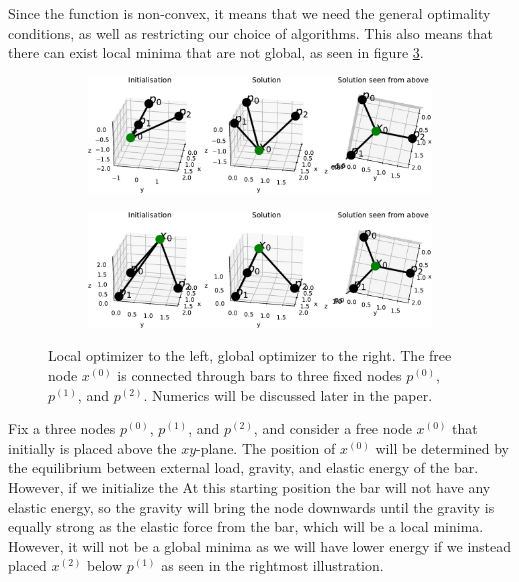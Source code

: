 Since the function is non-convex, it means that we need the general optimality conditions, as well as restricting our choice of algorithms. This also means that there can exist local minima that are not global, as seen in figure \ref{fig:local_optimizer}. 
\begin{figure}
\centering
\begin{subfigure}{.5\textwidth}
  \centering
  \includegraphics[width=\linewidth]{Bilder/localminpos.pdf}
  \label{fig:}
\end{subfigure}%
\begin{subfigure}{.5\textwidth}
  \centering
  \includegraphics[width=1\linewidth]{Bilder/localminneg.pdf}
  \label{fig:sub2}
\end{subfigure}
\caption{Local optimizer to the left, global optimizer to the right. The free node $x^{(0)}$ is connected through bars to three fixed nodes  $p^{(0)}$, $p^{(1)}$, and $p^{(2)}$. Numerics will be discussed later in the paper.}
\label{fig:local_optimizer}
\end{figure}

Fix a three nodes $p^{(0)}$, $p^{(1)}$, and $p^{(2)}$, and consider a free node $x^{(0)}$ that initially is placed above the $xy$-plane. The position of $x^{(0)}$ will be determined by the equilibrium between external load, gravity, and elastic energy of the bar. However, if we initialize the
At this starting position the bar will not have any elastic energy, so the gravity will bring the node downwards until the gravity is equally strong as the elastic force from the bar, which will be a local minima. However, it will not be a global minima as we will have lower energy if we instead placed $x^{(2)}$ below $p^{(1)}$ as seen in the rightmost illustration. 



